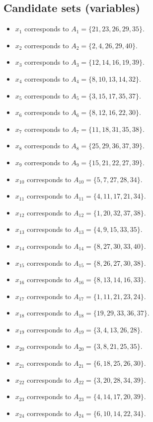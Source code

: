 \documentclass[11pt]{article}
\begin{document}
\subsection*{Candidate sets (variables)}
\begin{itemize}
\item $x_{1}$ corresponds to $A_{1}=\{21, 23, 26, 29, 35\}$.
\item $x_{2}$ corresponds to $A_{2}=\{2, 4, 26, 29, 40\}$.
\item $x_{3}$ corresponds to $A_{3}=\{12, 14, 16, 19, 39\}$.
\item $x_{4}$ corresponds to $A_{4}=\{8, 10, 13, 14, 32\}$.
\item $x_{5}$ corresponds to $A_{5}=\{3, 15, 17, 35, 37\}$.
\item $x_{6}$ corresponds to $A_{6}=\{8, 12, 16, 22, 30\}$.
\item $x_{7}$ corresponds to $A_{7}=\{11, 18, 31, 35, 38\}$.
\item $x_{8}$ corresponds to $A_{8}=\{25, 29, 36, 37, 39\}$.
\item $x_{9}$ corresponds to $A_{9}=\{15, 21, 22, 27, 39\}$.
\item $x_{10}$ corresponds to $A_{10}=\{5, 7, 27, 28, 34\}$.
\item $x_{11}$ corresponds to $A_{11}=\{4, 11, 17, 21, 34\}$.
\item $x_{12}$ corresponds to $A_{12}=\{1, 20, 32, 37, 38\}$.
\item $x_{13}$ corresponds to $A_{13}=\{4, 9, 15, 33, 35\}$.
\item $x_{14}$ corresponds to $A_{14}=\{8, 27, 30, 33, 40\}$.
\item $x_{15}$ corresponds to $A_{15}=\{8, 26, 27, 30, 38\}$.
\item $x_{16}$ corresponds to $A_{16}=\{8, 13, 14, 16, 33\}$.
\item $x_{17}$ corresponds to $A_{17}=\{1, 11, 21, 23, 24\}$.
\item $x_{18}$ corresponds to $A_{18}=\{19, 29, 33, 36, 37\}$.
\item $x_{19}$ corresponds to $A_{19}=\{3, 4, 13, 26, 28\}$.
\item $x_{20}$ corresponds to $A_{20}=\{3, 8, 21, 25, 35\}$.
\item $x_{21}$ corresponds to $A_{21}=\{6, 18, 25, 26, 30\}$.
\item $x_{22}$ corresponds to $A_{22}=\{3, 20, 28, 34, 39\}$.
\item $x_{23}$ corresponds to $A_{23}=\{4, 14, 17, 20, 39\}$.
\item $x_{24}$ corresponds to $A_{24}=\{6, 10, 14, 22, 34\}$.

\end{itemize}
\end{document}
